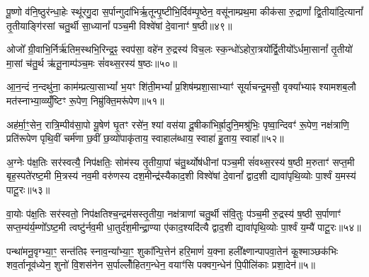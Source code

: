 पू॒ष्णो व॑नि॒ष्ठुर॑न्धा॒हेः स्थू॑रगु॒दा स॒र्पान्गुदा॑भिर्\mbox{}ऋ॒तून्पृ॒ष्टीभि॒र्दिव॑म्पृ॒ष्ठेन॒ वसू॑नाम्प्रथ॒मा कीक॑सा रु॒द्राणां᳚ द्वि॒तीया॑दि॒त्यानां᳚ तृ॒तीयाङ्गि॑रसां चतु॒र्थी सा॒ध्यानां᳚ पञ्च॒मी विश्वे॑षां दे॒वानाꣳ॑ ष॒ष्ठी॥४९॥

{\anuvakamend[{पू॒ष्णश्चतु॑र्विꣳशतिः॥17॥}]}

ओजो᳚ ग्री॒वाभि॒र्निर्\mbox{}ऋ॑तिम॒स्थभि॒रिन्द्र॒ꣴ॒ स्वप॑सा॒ वहे॑न रु॒द्रस्य॑ विच॒लः स्क॒न्धो॑\-ऽहोरा॒त्रयो᳚र्द्वि॒तीयो᳚\-ऽर्धमा॒सानां᳚ तृ॒तीयो॑ मा॒सां च॑तु॒र्थ ऋ॑तू॒नाम्प॑ञ्च॒मः सं॑वथ्स॒रस्य॑ ष॒ष्ठः॥५०॥

{\anuvakamend[{ओजो॑ विꣳश॒तिः॥18॥}]}

आ॒न॒न्दं न॒न्दथु॑ना॒ काम॑म्प्रत्या॒सा\-भ्यां᳚ भ॒यꣳ शि॑ती॒म\-भ्यां᳚ प्र॒शिष॑म्प्रशा॒साभ्याꣳ॑ सूर्याचन्द्र॒मसौ॒ वृक्या᳚भ्याꣴ श्यामशब॒लौ मत॑स्नाभ्या॒व्व्युँ॑ष्टिꣳ रू॒पेण॒ निम्रु॑क्ति॒मरू॑पेण॥५१॥

{\anuvakamend[{आ॒न॒न्दꣳ षोड॑श॥19॥}]}

अह॑र्मा॒ꣳ॒सेन॒ रात्रि॒म्पीव॑सा॒पो यू॒षेण॑ घृ॒तꣳ रसे॑न॒ श्यां वस॑या दू॒षीका॑भिर्\mbox{}ह्रा॒दुनि॒मश्रु॑भिः॒ पृष्वा॒न्दिवꣳ॑ रू॒पेण॒ नक्ष॑त्राणि॒ प्रति॑रूपेण पृथि॒वीं चर्म॑णा छ॒वीं छ॒व्यो॑पाकृ॑ताय॒ स्वाहाल॑ब्धाय॒ स्वाहा॑ हु॒ताय॒ स्वाहा᳚॥५२॥

{\anuvakamend[{अह॑र॒ष्टाविꣳ॑शतिः॥20॥}]}

अ॒ग्नेः प॑क्ष॒तिः सर॑स्वत्यै॒ निप॑क्षतिः॒ सोम॑स्य तृ॒तीया॒पां च॑तु॒र्थ्योष॑धीनां पञ्च॒मी सं॑वथ्स॒रस्य॑ ष॒ष्ठी म॒रुताꣳ॑ सप्त॒मी बृह॒स्पते॑रष्ट॒मी मि॒त्रस्य॑ नव॒मी वरु॑णस्य दश॒मीन्द्र॑स्यैकाद॒शी विश्वे॑षां दे॒वानां᳚ द्वाद॒शी द्यावा॑पृथि॒व्योः पा॒र्श्वं य॒मस्य॑ पाटू॒रः॥५३॥

{\anuvakamend[{अ॒ग्नेरेका॒न्नत्रि॒ꣳ॒शत्॥21॥}]}

वा॒योः प॑क्ष॒तिः सर॑स्वतो॒ निप॑क्षतिश्च॒न्द्रम॑सस्तृ॒तीया॒ नक्ष॑त्राणां चतु॒र्थी स॑वि॒तुः प॑ञ्च॒मी रु॒द्रस्य॑ ष॒ष्ठी स॒र्पाणाꣳ॑ सप्त॒म्य॑र्य॒म्णो᳚\-ऽष्ट॒मी त्वष्टु॑र्नव॒मी धा॒तुर्द॑श॒मीन्द्रा॒ण्या ए॑काद॒श्यदि॑त्यै द्वाद॒शी द्यावा॑पृथि॒व्योः पा॒र्श्वं य॒म्यै॑ पाटू॒रः॥५४॥

{\anuvakamend[{वा॒योर॒ष्टाविꣳ॑शतिः॥22॥}]}

पन्था॑मनू॒वृग्भ्या॒ꣳ॒ सन्त॑तिꣴ स्नाव॒न्या᳚भ्या॒ꣳ॒ शुका᳚न्पि॒त्तेन॑ हरि॒माणं॑ य॒क्ना हली᳚क्ष्णान्पापवा॒तेन॑ कू॒श्माञ्छक॑भिः शव॒र्तानूव॑ध्येन॒ शुनो॑ वि॒शस॑नेन स॒र्पाल्लोँ॑हितग॒न्धेन॒ वयाꣳ॑सि पक्वग॒न्धेन॑ पि॒पीलि॑काः प्रशा॒देन॑॥५॥

{\anuvakamend[{पन्था॒न्द्वाविꣳ॑शतिः॥23॥}]}

